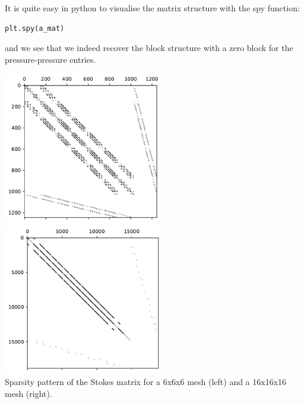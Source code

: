 It is quite easy in python to visualise the matrix structure 
with the spy function:
\begin{lstlisting}
plt.spy(a_mat)
\end{lstlisting} 
and we see that we indeed recover
the block structure with a zero block for the pressure-pressure entries.  
\begin{center}
\includegraphics[width=7cm]{python_codes/fieldstone_11/results/matrix6x6x6.pdf}
\includegraphics[width=7cm]{python_codes/fieldstone_11/results/matrix16x16x16.pdf}\\
{\captionfont Sparsity pattern of the Stokes matrix for a 6x6x6 mesh (left) and a 16x16x16 mesh (right).}
\end{center}

